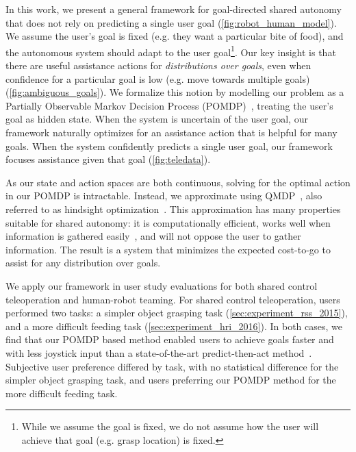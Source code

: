 In this work, we present a general framework for goal-directed shared autonomy that does not rely on predicting a single user goal (\cref{fig:robot_human_model}). We assume the user's goal is fixed (e.g. they want a particular bite of food), and the autonomous system should adapt to the user goal\footnote{While we assume the goal is fixed, we do not assume how the user will achieve that goal (e.g. grasp location) is fixed.}. Our key insight is that there are useful assistance actions for \emph{distributions over goals}, even when confidence for a particular goal is low (e.g. move towards multiple goals) (\cref{fig:ambiguous_goals}). We formalize this notion by modelling our problem as a Partially Observable Markov Decision Process (POMDP)~\citep{kaelbling_1998_pomdp}, treating the user's goal as hidden state. When the system is uncertain of the user goal, our framework naturally optimizes for an assistance action that is helpful for many goals. When the system confidently predicts a single user goal, our framework focuses assistance given that goal (\cref{fig:teledata}). %

As our state and action spaces are both continuous, solving for the optimal action in our POMDP is intractable. Instead, we approximate using QMDP~\citep{littman_1995}, also referred to as hindsight optimization~\citep{chong_2000,yoon_2008}. This approximation has many properties suitable for shared autonomy: it is computationally efficient, works well when information is gathered easily~\citep{koval_2014}, and will not oppose the user to gather information. The result is a system that minimizes the expected cost-to-go to assist for any distribution over goals. 

We apply our framework in user study evaluations for both shared control teleoperation and human-robot teaming. For shared control teleoperation, users performed two tasks: a simpler object grasping task (\cref{sec:experiment_rss_2015}), and a more difficult feeding task (\cref{sec:experiment_hri_2016}). In both cases, we find that our POMDP based method enabled users to achieve goals faster and with less joystick input than a state-of-the-art predict-then-act method~\citep{dragan_2013_assistive}. Subjective user preference differed by task, with no statistical difference for the simpler object grasping task, and users preferring our POMDP method for the more difficult feeding task. 

